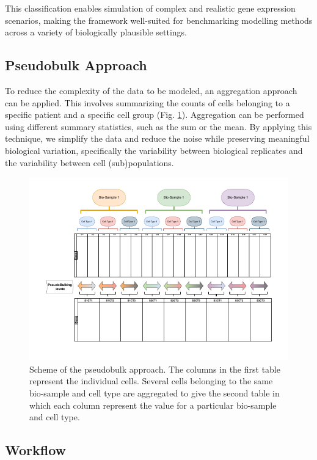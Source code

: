 \documentclass[a4paper, 11pt, twocolumn]{article}
\begin{document}
\begin{multicols}{2}
This classification enables simulation of complex and realistic gene expression scenarios, making the framework well-suited for benchmarking modelling methods across a variety of biologically plausible settings.

\subsection{Pseudobulk Approach}

To reduce the complexity of the data to be modeled, an aggregation approach can be applied. This involves summarizing the counts of cells belonging to a specific patient and a specific cell group (Fig. \ref{fig:pseudobulk}). Aggregation can be performed using different summary statistics, such as the sum or the mean. By applying this technique, we simplify the data and reduce the noise while preserving meaningful biological variation, specifically the variability between biological replicates and the variability between cell (sub)populations.
\begin{figure}[H]
	\centering
	\includegraphics[width=1\columnwidth]{img/rnapseudobulk.drawio-1.pdf}
	\caption{{\footnotesize Scheme of the pseudobulk approach. The columns in the first table represent the individual cells. Several cells belonging to the same bio-sample and cell type are aggregated to give the second table in which each column represent the value for a particular bio-sample and cell type.}}
	\label{fig:pseudobulk}
\end{figure}

\subsection{Workflow}


\end{multicols}
\end{document}
